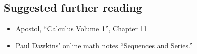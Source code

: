 \subsection*{Suggested further reading}

\begin{itemize}
  \item Apostol, ``Calculus Volume 1'', Chapter 11
  \item \href{https://tutorial.math.lamar.edu/Classes/CalcII/SeriesIntro.aspx}{Paul Dawkins' online math notes ``Sequences and Series.''}
\end{itemize}



















